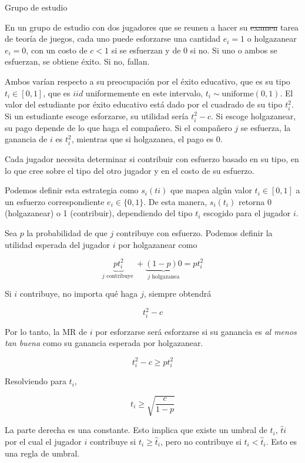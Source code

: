 \documentclass[12pt]{article}
\begin{document}
\begin{exbox}{Grupo de estudio}

	En un grupo de estudio con dos jugadores que se reunen a hacer su \sout{examen} tarea de teoría de juegos, cada uno puede esforzarse una cantidad $e_i=1$ o holgazanear $e_i=0$, con un costo de $c<1$ si se esfuerzan y de 0 si no. Si uno o ambos se esfuerzan, se obtiene éxito. Si no, fallan.

	Ambos varían respecto a su preocupación por el éxito educativo, que es su tipo $t_i \in [0, 1]$, que es $iid$ uniformemente en este intervalo, $t_i \sim \text{uniforme}(0,1)$. El valor del estudiante por éxito educativo está dado por el cuadrado de su tipo $t_i^2$. Si un estudiante escoge esforzarse, su utilidad sería $t_i^2 - c$. Si escoge holgazanear, su pago depende de lo que haga el compañero. Si el compañero $j$ se esfuerza, la ganancia de $i$ es $t_i^2$, mientras que si holgazanea, el pago es 0.

	Cada jugador necesita determinar si contribuir con esfuerzo basado en su tipo, en lo que cree sobre el tipo del otro jugador y en el costo de su esfuerzo.

	Podemos definir esta estrategia como $ s_i(ti) $ que mapea algún valor $t_i \in [0,1]$ a un esfuerzo correspondiente $ e_i \in \{0, 1\} $. De esta manera, $ s_i(t_i) $ retorna 0 (holgazanear) o 1 (contribuir), dependiendo del tipo $t_i$ escogido para el jugador $ i $.

	Sea $ p $ la probabilidad de que $ j $ contribuye con esfuerzo. Podemos definir la utilidad esperada del jugador $ i $ por holgazanear como

	$$ \underbrace{pt_i^2}_{j \text{ contribuye }} + \underbrace{(1-p)0}_{j \text{ holgazanea}} = pt_i^2 $$

	Si $ i $ contribuye, no importa qué haga $ j $, siempre obtendrá

	$$ t_i^2 - c $$

	Por lo tanto, la MR de $ i $ por esforzarse será esforzarse si su ganancia es \textit{al menos tan buena} como su ganancia esperada por holgazanear.

	$$ t_i^2 - c \geq pt_i^2 $$

	Resolviendo para $ t_i $,

	$$ t_i \geq \sqrt{\frac{c}{1-p}} $$

	La parte derecha es una constante. Esto implica que existe un umbral de $t_i$, $\hat{t}i$ por el cual el jugador $ i $ contribuye si $ t_i \geq \hat{t}_i $, pero no contribuye si $ t_i < \hat{t}_i $. Esto es una regla de umbral.


\end{exbox}
\end{document}
